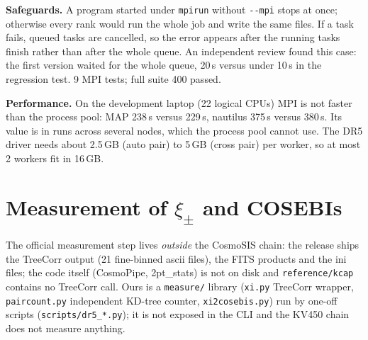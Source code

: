 \documentclass[10pt,a4paper]{article}
\newcommand{\file}[1]{{\small\texttt{#1}}}
\begin{document}
\textbf{Safeguards.} A program started under \texttt{mpirun} without \texttt{-{}-mpi} stops at once; otherwise every rank would run the whole job and write the same files. If a task fails, queued tasks are cancelled, so the error appears after the running tasks finish rather than after the whole queue. An independent review found this case: the first version waited for the whole queue, 20\,s versus under 10\,s in the regression test. 9 MPI tests; full suite 400 passed.

\textbf{Performance.} On the development laptop (22 logical CPUs) MPI is not faster than the process pool: MAP 238\,s versus 229\,s, nautilus 375\,s versus 380\,s. Its value is in runs across several nodes, which the process pool cannot use. The DR5 driver needs about 2.5\,GB (auto pair) to 5\,GB (cross pair) per worker, so at most 2 workers fit in 16\,GB.

\section{Measurement of $\xi_\pm$ and COSEBIs}
The official measurement step lives \emph{outside} the CosmoSIS chain: the release ships the TreeCorr output (21 fine-binned ascii files), the FITS products and the ini files; the code itself (CosmoPipe, 2pt\_stats) is not on disk and \file{reference/kcap} contains no TreeCorr call. Ours is a \file{measure/} library (\file{xi.py} TreeCorr wrapper, \file{paircount.py} independent KD-tree counter, \file{xi2cosebis.py}) run by one-off scripts (\file{scripts/dr5\_*.py}); it is not exposed in the CLI and the KV450 chain does not measure anything.
\end{document}

